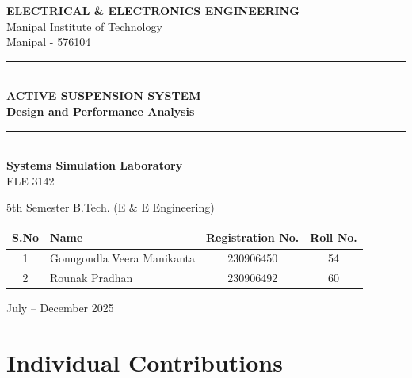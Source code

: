 \documentclass[12pt,a4paper]{article}
\begin{document}
\begin{titlepage}
    \centering
    \vspace*{1cm}
    
    
    {\LARGE\bfseries ELECTRICAL \& ELECTRONICS ENGINEERING\\[0.3cm]}
    {\Large Manipal Institute of Technology\\[0.5cm]}
    {\large Manipal - 576104\\[1cm]}
    
    \rule{\linewidth}{0.5mm}\\[0.4cm]
    {\huge\bfseries ACTIVE SUSPENSION SYSTEM\\[0.2cm]
    Design and Performance Analysis\\[0.4cm]}
    \rule{\linewidth}{0.5mm}\\[1.5cm]
    
    {\Large\textbf{Systems Simulation Laboratory}\\[0.2cm]
    ELE 3142\\[0.5cm]}
    
    {\large 5th Semester B.Tech. (E \& E Engineering)\\[1.5cm]}
    
    \begin{table}[H]
    \centering
    \begin{tabular}{|c|l|c|c|}
    \hline
    \textbf{S.No} & \textbf{Name} & \textbf{Registration No.} & \textbf{Roll No.} \\ \hline
    1 & Gonugondla Veera Manikanta & 230906450 & 54 \\ \hline
    2 & Rounak Pradhan & 230906492 & 60 \\ \hline
    \end{tabular}
    \end{table}
    
    \vfill
    
    {\large July -- December 2025}
    
\end{titlepage}

\newpage
\section*{Individual Contributions}
\end{document}
